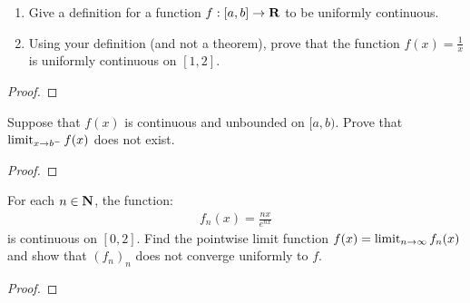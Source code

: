 \documentclass[11pt,twoside,openany]{memoir}
\begin{document}
\newpage
\fancyhead[L]{\scalebox{0.9}{Continuity}}
\fancyhead[R]{\scalebox{0.9}{Appeared on: F24}}
\begin{problem}
    \phantom{a}
    \begin{enumerate}[label = (\arabic*)]
        \item Give a definition for a function $f:[a,b] \rightarrow \mathbf{R}$ to be uniformly continuous.
        \item Using your definition (and not a theorem), prove that the function $f(x) = \frac{1}{x}$ is uniformly continuous on $[1,2]$.
    \end{enumerate}
\end{problem}
\begin{proof}
\end{proof}

\newpage
\fancyhead[L]{\scalebox{0.9}{Continuity}}
\fancyhead[R]{\scalebox{0.9}{Appeared on: F23}}
\begin{problem}
    Suppose that $f(x)$ is continuous and unbounded on $[a,b)$. Prove that $\operatorname*{limit}_{x \rightarrow b^{-}}f(x)$ does not exist.
\end{problem}
\begin{proof}
\end{proof}

\newpage
\fancyhead[L]{\scalebox{0.9}{Continuity}}
\fancyhead[R]{\scalebox{0.9}{Appeared on: S23}}
\begin{problem}
    For each $n \in \mathbf{N}$, the function:
        \begin{equation*}
        \begin{split}
            f_n(x) = \frac{nx}{e^{nx}}
        \end{split}
        \end{equation*}
    is continuous on $[0,2]$. Find the pointwise limit function $f(x) = \operatorname*{limit}_{n \rightarrow \infty}f_n(x)$ and show that $(f_n)_n$ does not converge uniformly to $f$.
\end{problem}
\begin{proof}
\end{proof}
\end{document}
